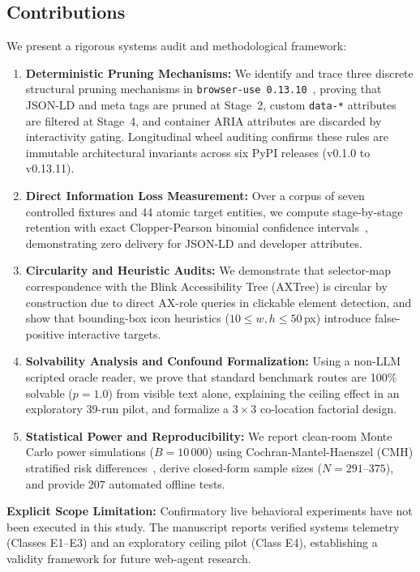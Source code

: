\documentclass[conference]{IEEEtran}
\begin{document}
\subsection{Contributions}
We present a rigorous systems audit and methodological framework:
\begin{enumerate}
    \item \textbf{Deterministic Pruning Mechanisms:} We identify and trace three discrete structural pruning mechanisms in \texttt{browser-use 0.13.10}~\cite{browseruse2024}, proving that JSON-LD and meta tags are pruned at Stage~2, custom \texttt{data-*} attributes are filtered at Stage~4, and container ARIA attributes are discarded by interactivity gating. Longitudinal wheel auditing confirms these rules are immutable architectural invariants across six PyPI releases (v0.1.0 to v0.13.11).
    \item \textbf{Direct Information Loss Measurement:} Over a corpus of seven controlled fixtures and 44 atomic target entities, we compute stage-by-stage retention with exact Clopper-Pearson binomial confidence intervals~\cite{clopper1934use}, demonstrating zero delivery for JSON-LD and developer attributes.
    \item \textbf{Circularity and Heuristic Audits:} We demonstrate that selector-map correspondence with the Blink Accessibility Tree (AXTree) is circular by construction due to direct AX-role queries in clickable element detection, and show that bounding-box icon heuristics ($10 \le w, h \le 50$\,px) introduce false-positive interactive targets.
    \item \textbf{Solvability Analysis and Confound Formalization:} Using a non-LLM scripted oracle reader, we prove that standard benchmark routes are 100\% solvable ($p=1.0$) from visible text alone, explaining the ceiling effect in an exploratory 39-run pilot, and formalize a $3 \times 3$ co-location factorial design.
    \item \textbf{Statistical Power and Reproducibility:} We report clean-room Monte Carlo power simulations ($B=10\,000$) using Cochran-Mantel-Haenszel (CMH) stratified risk differences~\cite{mantel1959statistical, sato1989variance, greenland1985estimation, agresti2002categorical, newcombe1998interval, wilson1927probable}, derive closed-form sample sizes ($N=291\text{--}375$), and provide 207 automated offline tests.
\end{enumerate}

\textbf{Explicit Scope Limitation:} Confirmatory live behavioral experiments have not been executed in this study. The manuscript reports verified systems telemetry (Classes E1--E3) and an exploratory ceiling pilot (Class E4), establishing a validity framework for future web-agent research.
\end{document}
